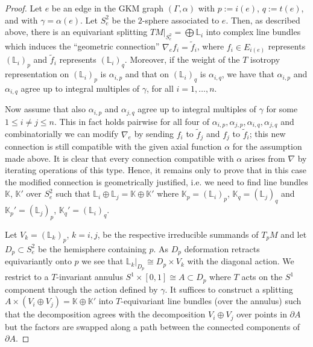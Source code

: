 \documentclass[12pt,a4paper]{amsart}
\theoremstyle{plain}
\theoremstyle{definition}
\begin{document}
\begin{proof}
Let $e$ be an edge in the GKM graph $(\Gamma,\alpha)$ with $p:=i(e)$, $q:=t(e)$, and with
$\gamma=\alpha(e)$. Let $S^2_e$ be the $2$-sphere associated to $e$. Then, as described
above, there is an equivariant splitting $TM|_{S_e^2}=\bigoplus \mathbb L_i$ into complex line
bundles which induces the ``geometric connection'' $\nabla_ef_i=\widetilde{f}_i$, where $f_i\in E_{i(e)}$
represents $(\mathbb L_i)_p$ and $\widetilde{f}_i$ represents $(\mathbb L_i)_q$. Moreover, if
the weight of the $T$ isotropy representation on $(\mathbb L_i)_p$ is $\alpha_{i,p}$
 and that on $(\mathbb L_i)_q$ is $\alpha_{i,q}$, we have that $\alpha_{i,p}$ and $\alpha_{i,q}$
 agree up to integral multiples of $\gamma$, for all $i=1,\ldots,n$.

Now assume that also $\alpha_{i,p}$ and $\alpha_{j,q}$
agree up to integral multiples of $\gamma$ for some $1\leq i\neq j\leq n$. This in fact
holds pairwise for all four of  $\alpha_{i,p},\alpha_{j,p},\alpha_{i,q},\alpha_{j,q}$ and
combinatorially we can modify $\nabla_e$ by sending $f_i$ to $\widetilde{f}_j$ and $f_j$
to $\widetilde{f}_i$; this new connection is still compatible with the given axial function $\alpha$ for the assumption
made above.
It is clear that every connection compatible with $\alpha$ arises from
$\nabla$ by iterating operations of this type. Hence, it remains only to prove that in this
case the modified connection is geometrically justified, i.e. we need to find 
line bundles $\mathbb K$, $\mathbb K'$ over $S^2_e$
such that 
$\mathbb L_i\oplus \mathbb L_j = \mathbb K\oplus \mathbb K'$ where $\mathbb
K_p=(\mathbb L_i)_p$, $\mathbb K_q=(\mathbb L_j)_q$ and $\mathbb K_p'=(\mathbb L_j)_p$,
$\mathbb K_q'=(\mathbb L_i)_q$.

Let $V_k=(\mathbb L_k)_p$, $k=i,j$, be the respective irreducible summands of $T_p M$ and
let $D_p\subset S^2_e$ be the hemisphere containing $p$. As $D_p$ deformation retracts
equivariantly onto $p$ we see that $\mathbb L_k|_{D_p}\cong D_p\times V_k$ with the diagonal
action. We restrict to a $T$-invariant annulus $S^1\times [0,1]\cong A\subset D_p$ where
$T$ acts on the $S^1$ component through the action defined by $\gamma$. It suffices to
construct a splitting $A\times (V_i\oplus V_j)=\mathbb K\oplus \mathbb K'$ into
$T$-equivariant line bundles (over the annulus) such that the decomposition agrees with the decomposition
$V_i\oplus V_j$ over points in $\partial A$ but the factors are swapped along a path
between the connected components of $\partial A$.


\end{proof}
\end{document}

